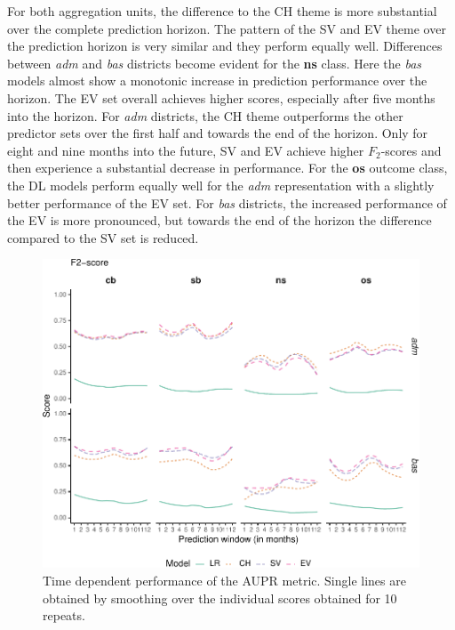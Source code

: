\documentclass[a4paper,11pt]{article}
\begin{document}
For both aggregation units, the difference to the CH theme is more substantial
over the complete prediction horizon. The pattern of the SV and EV theme
over the prediction horizon is very similar and they perform equally well.
Differences between \emph{adm} and \emph{bas} districts become evident for the \textbf{ns} class.
Here the \emph{bas} models almost show a monotonic increase in prediction performance
over the horizon. The EV set overall achieves higher scores, especially after
five months into the horizon. For \emph{adm} districts, the CH theme outperforms the
other predictor sets over the first half and towards the end of the horizon.
Only for eight and nine months into the future, SV and EV achieve higher \(F_2\)-scores
and then experience a substantial decrease in performance. For the \textbf{os} outcome
class, the DL models perform equally well for the \emph{adm} representation with a slightly
better performance of the EV set. For \emph{bas} districts, the increased performance
of the EV is more pronounced, but towards the end of the horizon the difference compared
to the SV set is reduced.
\begin{figure}[H]

{\centering \includegraphics{thesis_files/figure-latex/04-results-time-aupr-1} 

}

\caption[Time dependent performance of the AUPR metric.]{Time dependent performance of the AUPR metric. Single lines are obtained by smoothing over the individual scores obtained for 10 repeats.}\label{fig:04-results-time-aupr}
\end{figure}
\end{document}
